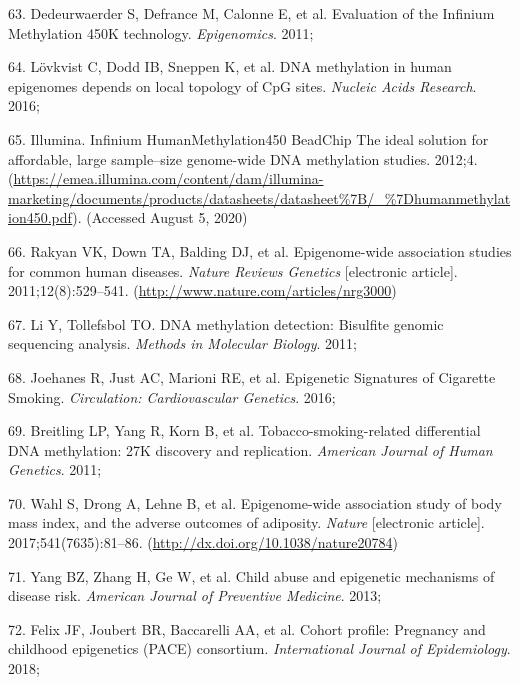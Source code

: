 \documentclass[11pt,oneside]{bristolthesis}
\newenvironment{cslreferences}%
  {}%
  {\par}
\begin{document}
\begin{cslreferences}
\leavevmode\hypertarget{ref-Dedeurwaerder2011}{}%
63. Dedeurwaerder S, Defrance M, Calonne E, et al. Evaluation of the Infinium Methylation 450K technology. \emph{Epigenomics}. 2011;

\leavevmode\hypertarget{ref-Lovkvist2016}{}%
64. Lövkvist C, Dodd IB, Sneppen K, et al. DNA methylation in human epigenomes depends on local topology of CpG sites. \emph{Nucleic Acids Research}. 2016;

\leavevmode\hypertarget{ref-Illumina2012}{}%
65. Illumina. Infinium HumanMethylation450 BeadChip The ideal solution for affordable, large sample--size genome-wide DNA methylation studies. 2012;4. (\url{https://emea.illumina.com/content/dam/illumina-marketing/documents/products/datasheets/datasheet\%7B/_\%7Dhumanmethylation450.pdf}). (Accessed August 5, 2020)

\leavevmode\hypertarget{ref-Rakyan2011}{}%
66. Rakyan VK, Down TA, Balding DJ, et al. Epigenome-wide association studies for common human diseases. \emph{Nature Reviews Genetics} {[}electronic article{]}. 2011;12(8):529--541. (\url{http://www.nature.com/articles/nrg3000})

\leavevmode\hypertarget{ref-Li2011}{}%
67. Li Y, Tollefsbol TO. DNA methylation detection: Bisulfite genomic sequencing analysis. \emph{Methods in Molecular Biology}. 2011;

\leavevmode\hypertarget{ref-Joehanes2016}{}%
68. Joehanes R, Just AC, Marioni RE, et al. Epigenetic Signatures of Cigarette Smoking. \emph{Circulation: Cardiovascular Genetics}. 2016;

\leavevmode\hypertarget{ref-Breitling2011}{}%
69. Breitling LP, Yang R, Korn B, et al. Tobacco-smoking-related differential DNA methylation: 27K discovery and replication. \emph{American Journal of Human Genetics}. 2011;

\leavevmode\hypertarget{ref-Wahl2017}{}%
70. Wahl S, Drong A, Lehne B, et al. Epigenome-wide association study of body mass index, and the adverse outcomes of adiposity. \emph{Nature} {[}electronic article{]}. 2017;541(7635):81--86. (\url{http://dx.doi.org/10.1038/nature20784})

\leavevmode\hypertarget{ref-Yang2013}{}%
71. Yang BZ, Zhang H, Ge W, et al. Child abuse and epigenetic mechanisms of disease risk. \emph{American Journal of Preventive Medicine}. 2013;

\leavevmode\hypertarget{ref-Felix2018}{}%
72. Felix JF, Joubert BR, Baccarelli AA, et al. Cohort profile: Pregnancy and childhood epigenetics (PACE) consortium. \emph{International Journal of Epidemiology}. 2018;


\end{cslreferences}
\end{document}
